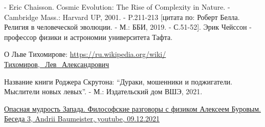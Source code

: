 - Eric Chaisson. Cosmic
Evolution: The Rise of Complexity in Nature. - Cambridge Mass.: Harvard UP,
2001. - P.211-213 [цитата по: Роберт Белла. Религия в человеческой эволюции. -
М.: ББИ, 2019. - С.51-52]. Эрик Чейссон - профессор физики и астрономии
университета Тафта. 

О Льве Тихомирове: \url{https://ru.wikipedia.org/wiki/Тихомиров,_Лев_Александрович} 

Название книги Роджера Скрутона: \enquote{Дураки, мошенники и поджигатели.
Мыслители новых левых}. - М.: Издательский дом ВШЭ, 2021.

\href{https://www.youtube.com/watch?v=h2cWKWp0AkU}{%
Опасная мудрость Запада. Философские разговоры с физиком Алексеем Буровым. Беседа 3, %
Andrii Baumeister, youtube, 09.12.2021%
}


